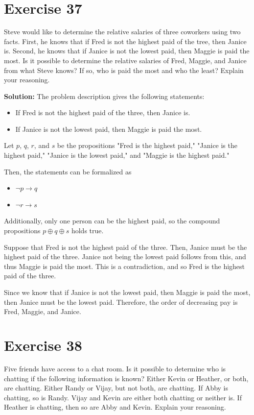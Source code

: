 \documentclass{Axon}
\begin{document}
\section*{Exercise 37}
Steve would like to determine the relative salaries of three coworkers using two facts. First, he knows that if Fred is not the highest paid of the tree, then Janice is. Second, he knows that if Janice is not the lowest paid, then Maggie is paid the most. Is it possible to determine the relative salaries of Fred, Maggie, and Janice from what Steve knows? If so, who is paid the most and who the least? Explain your reasoning.

\noindent
\textbf{Solution:}
The problem description gives the following statements:
\begin{itemize}
    \item If Fred is not the highest paid of the three, then Janice is.
    \item If Janice is not the lowest paid, then Maggie is paid the most.
\end{itemize}
Let \(p\), \(q\), \(r\), and \(s\) be the propositions "Fred is the highest paid," "Janice is the highest paid," "Janice is the lowest paid," and "Maggie is the highest paid."

Then, the statements can be formalized as
\begin{itemize}
    \item \(\lnot p \to q\) 
    \item \(\lnot r \to s\)
\end{itemize}
Additionally, only one person can be the highest paid, so the compound propositions \(p \oplus q \oplus s\) holds true.

Suppose that Fred is not the highest paid of the three. Then, Janice must be the highest paid of the three. Janice not being the lowest paid follows from this, and thus Maggie is paid the most. This is a contradiction, and so Fred is the highest paid of the three.

Since we know that if Janice is not the lowest paid, then Maggie is paid the most, then Janice must be the lowest paid. Therefore, the order of decreasing pay is Fred, Maggie, and Janice.

\section*{Exercise 38}
Five friends have access to a chat room. Is it possible to determine who is chatting if the following information is known? Either Kevin or Heather, or both, are chatting. Either Randy or Vijay, but not both, are chatting. If Abby is chatting, so is Randy. Vijay and Kevin are either both chatting or neither is. If Heather is chatting, then so are Abby and Kevin. Explain your reasoning.
\end{document}
